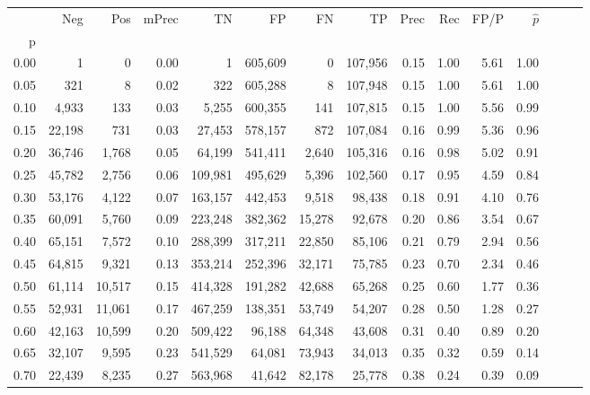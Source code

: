 \begin{tabular}{rrrrrrrrrrrrrrr}
\toprule
{} &     Neg &     Pos & mPrec &       TN &       FP &       FN &       TP &  Prec &   Rec &  FP/P & $\hat{p}$ \\
p    &         &         &       &          &          &          &          &       &       &       &           \\
\midrule
0.00 &       1 &       0 &  0.00 &        1 &  605,609 &        0 &  107,956 &  0.15 &  1.00 &  5.61 &      1.00 \\
0.05 &     321 &       8 &  0.02 &      322 &  605,288 &        8 &  107,948 &  0.15 &  1.00 &  5.61 &      1.00 \\
0.10 &   4,933 &     133 &  0.03 &    5,255 &  600,355 &      141 &  107,815 &  0.15 &  1.00 &  5.56 &      0.99 \\
0.15 &  22,198 &     731 &  0.03 &   27,453 &  578,157 &      872 &  107,084 &  0.16 &  0.99 &  5.36 &      0.96 \\
0.20 &  36,746 &   1,768 &  0.05 &   64,199 &  541,411 &    2,640 &  105,316 &  0.16 &  0.98 &  5.02 &      0.91 \\
0.25 &  45,782 &   2,756 &  0.06 &  109,981 &  495,629 &    5,396 &  102,560 &  0.17 &  0.95 &  4.59 &      0.84 \\
0.30 &  53,176 &   4,122 &  0.07 &  163,157 &  442,453 &    9,518 &   98,438 &  0.18 &  0.91 &  4.10 &      0.76 \\
0.35 &  60,091 &   5,760 &  0.09 &  223,248 &  382,362 &   15,278 &   92,678 &  0.20 &  0.86 &  3.54 &      0.67 \\
0.40 &  65,151 &   7,572 &  0.10 &  288,399 &  317,211 &   22,850 &   85,106 &  0.21 &  0.79 &  2.94 &      0.56 \\
0.45 &  64,815 &   9,321 &  0.13 &  353,214 &  252,396 &   32,171 &   75,785 &  0.23 &  0.70 &  2.34 &      0.46 \\
0.50 &  61,114 &  10,517 &  0.15 &  414,328 &  191,282 &   42,688 &   65,268 &  0.25 &  0.60 &  1.77 &      0.36 \\
0.55 &  52,931 &  11,061 &  0.17 &  467,259 &  138,351 &   53,749 &   54,207 &  0.28 &  0.50 &  1.28 &      0.27 \\
0.60 &  42,163 &  10,599 &  0.20 &  509,422 &   96,188 &   64,348 &   43,608 &  0.31 &  0.40 &  0.89 &      0.20 \\
0.65 &  32,107 &   9,595 &  0.23 &  541,529 &   64,081 &   73,943 &   34,013 &  0.35 &  0.32 &  0.59 &      0.14 \\
0.70 &  22,439 &   8,235 &  0.27 &  563,968 &   41,642 &   82,178 &   25,778 &  0.38 &  0.24 &  0.39 &      0.09 \\

\end{tabular}
